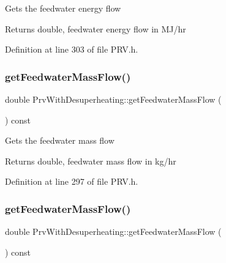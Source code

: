 Gets the feedwater energy flow \begin{DoxyReturn}{Returns}
double, feedwater energy flow in M\+J/hr 
\end{DoxyReturn}


Definition at line 303 of file P\+R\+V.\+h.

\mbox{\label{class_prv_with_desuperheating_a9bd8ee7d5b563110a7279102352b8f4d}} 
\subsubsection{\texorpdfstring{get\+Feedwater\+Mass\+Flow()}{getFeedwaterMassFlow()}\hspace{0.1cm}{\footnotesize\ttfamily [1/3]}}
{\footnotesize\ttfamily double Prv\+With\+Desuperheating\+::get\+Feedwater\+Mass\+Flow (\begin{DoxyParamCaption}{ }\end{DoxyParamCaption}) const\hspace{0.3cm}{\ttfamily [inline]}}

Gets the feedwater mass flow \begin{DoxyReturn}{Returns}
double, feedwater mass flow in kg/hr 
\end{DoxyReturn}


Definition at line 297 of file P\+R\+V.\+h.

\mbox{\label{class_prv_with_desuperheating_a9bd8ee7d5b563110a7279102352b8f4d}} 
\subsubsection{\texorpdfstring{get\+Feedwater\+Mass\+Flow()}{getFeedwaterMassFlow()}\hspace{0.1cm}{\footnotesize\ttfamily [2/3]}}
{\footnotesize\ttfamily double Prv\+With\+Desuperheating\+::get\+Feedwater\+Mass\+Flow (\begin{DoxyParamCaption}{ }\end{DoxyParamCaption}) const\hspace{0.3cm}{\ttfamily [inline]}}

